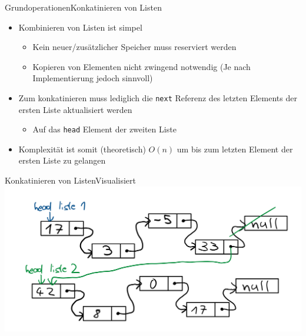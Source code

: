 \begin{frame}{Grundoperationen}{Konkatinieren von Listen}
	\begin{itemize}
		\item Kombinieren von Listen ist simpel
		\begin{itemize}
			\item Kein neuer/zusätzlicher Speicher muss reserviert werden
			\item Kopieren von Elementen nicht zwingend notwendig (Je nach Implementierung jedoch sinnvoll)
		\end{itemize}
		\item Zum konkatinieren muss lediglich die \texttt{next} Referenz des letzten Elements der ersten Liste aktualisiert werden
		\begin{itemize}
			\item Auf das \texttt{head} Element der zweiten Liste
		\end{itemize}
		\item Komplexität ist somit (theoretisch) $O(n)$ um bis zum letzten Element der ersten Liste zu gelangen
	\end{itemize}
\end{frame}

\begin{frame}{Konkatinieren von Listen}{Visualisiert}
\includegraphics[width=.8\textwidth]{graph/llist_concatenate}
\end{frame}

